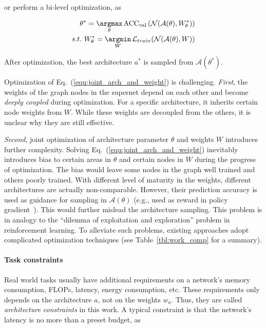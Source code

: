 or perform a bi-level optimization, as

\begin{equation}
\begin{aligned}
\theta^* = \mathop{\argmax}_{\theta}\text{ACC}_\text{val} \left( \mathcal{N}(\mathcal{A}(\theta), W^*_{\theta}) \right) \\
s.t. \ W^*_{\theta} = \mathop{\argmin}_{W}\mathcal{L}_{train}(\mathcal{N}(\mathcal{A}(\theta), W))
\label{equ:darts}
\end{aligned}
\end{equation}

After optimization, the best architecture $a^*$ is sampled from $\mathcal{A}(\theta^*)$. 

Optimization of Eq.~(\ref{equ:joint_arch_and_weight}) is challenging. \emph{First}, the weights of the graph nodes in the supernet depend on each other and become \emph{deeply coupled} during optimization. For a specific architecture, it inherits certain node weights from $W$. While these weights are decoupled from the others, it is unclear why they are still effective.

\emph{Second}, joint optimization of architecture parameter $\theta$ and weights $W$ introduces further complexity. Solving Eq.~(\ref{equ:joint_arch_and_weight}) inevitably introduces bias to certain areas in $\theta$ and certain nodes in $W$ during the progress of optimization. The bias would leave some nodes in the graph well trained and others poorly trained. With different level of maturity in the weights, different architectures are actually non-comparable. However, their prediction accuracy is used as guidance for sampling in $\mathcal{A}(\theta)$ (e.g., used as reward in policy gradient~\cite{cai2018proxylessnas}). This would further mislead the architecture sampling. This problem is in analogy to the ``dilemma of exploitation and exploration'' problem in reinforcement learning. To alleviate such problems, existing approaches adopt complicated optimization techniques (see Table~\ref{tbl:work_comp} for a summary). 

\paragraph{Task constraints} Real world tasks usually have additional requirements on a network's memory consumption, FLOPs, latency, energy consumption, etc. These requirements only depends on the architecture $a$, not on the weights $w_a$. Thus, they are called \emph{architecture constraints} in this work. A typical constraint is that the network's latency is no more than a preset budget, as

